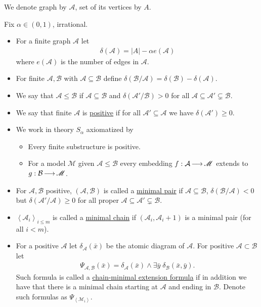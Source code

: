 \documentclass{amsart}
\newcommand{\MM}{\mathscr M}
\newcommand{\defn}{\underline}
\newcommand{\A}{\mathcal A}
\newcommand{\B}{\mathcal B}
\newcommand{\M}{\mathcal M}
\newcommand{\agl}[1]{\left\langle #1 \right\rangle}
\begin{document}
We denote graph by $\A$, set of its vertices by $A$.
\begin{Definition}
  Fix $\alpha \in (0,1)$, irrational.
  \begin{itemize}
  \item For a finite graph $\A$ let
    \begin{align*}
      \delta(\A) = |A| - \alpha e(\A)
    \end{align*}
    where $e(\A)$ is the number of edges in $\A$.

  \item For finite $\A,\B$ with $\A \subseteq \B$ define $\delta(\B/\A) = \delta(\B) - \delta(\A)$.
  \item We say that $\A \leq \B$ if $\A \subseteq \B$ and $\delta(\A'/\B) > 0$ for all $\A \subseteq \A' \subsetneq \B$.

  \item We say that finite $\A$ is \defn{positive} if for all $\A' \subseteq \A$ we have $\delta(\A') \geq 0$.

  \item We work in theory $S_\alpha$ axiomatized by
    \begin{itemize}
    \item Every finite substructure is positive.
    \item For a model $\MM$ given $\A \leq \B$ every embedding $f : \A \arr \MM$ extends to $g: \B \arr \MM$.
    \end{itemize}

  \item For $\A, \B$ positive, $(\A, \B)$ is called a \defn{minimal pair} if
    $\A \subseteq \B$, $\delta(\B/\A) < 0$ but $\delta(\A'/\A) \geq 0$ for all proper $\A \subseteq \A' \subsetneq \B$.

  \item $\agl{\A_i}_{i \leq m}$ is called a \defn{minimal chain} if $(\A_i, \A_i+1)$ is a minimal pair (for all $i < m$).

  \item For a positive $\A$ let $\delta_\A(\bar x)$ be the atomic diagram of $\A$. For positive $\A \subset \B$ let 
    \begin{align*}
      \Psi_{\A,\B}(\bar x) = \delta_\A(\bar x) \wedge \exists \bar y \; \delta_\B(\bar x, \bar y).
    \end{align*}
    Such formula is called a \defn{chain-minimal extension formula} if in addition we have that there is a minimal chain starting at 
    $\A$ and ending in $\B$.
    Denote such formulas as $\Psi_{\agl{\M_i}}$.
  \end{itemize}
\end{Definition}
\end{document}
